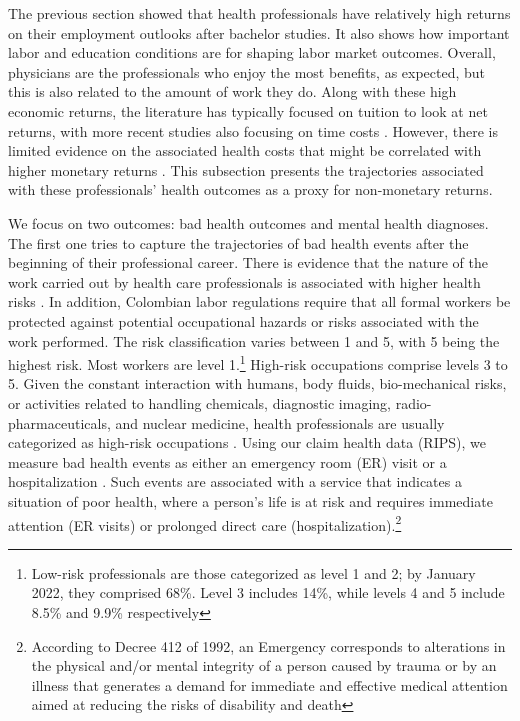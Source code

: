 \documentclass[12pt, a4paper]{article}
\begin{document}
The previous section showed that health professionals have relatively high returns on their employment outlooks after bachelor studies. It also shows how important labor and education conditions are for shaping labor market outcomes. Overall, physicians are the professionals who enjoy the most benefits, as expected, but this is also related to the amount of work they do. Along with these high economic returns, the literature has typically focused on tuition \citep{altonji2018costs} to look at net returns, with more recent studies also focusing on time costs \citep{altonji2023effects}. However, there is limited evidence on the associated health costs that might be correlated with higher monetary returns \citep{heckman2018returns}. This subsection presents the trajectories associated with these professionals' health outcomes as a proxy for non-monetary returns. 

We focus on two outcomes: bad health outcomes and mental health diagnoses. The first one tries to capture the trajectories of bad health events after the beginning of their professional career. There is evidence that the nature of the work carried out by health care professionals is associated with higher health risks \citep{mohanty2019health,kobo2023causes}. In addition, Colombian labor regulations require that all formal workers be protected against potential occupational hazards or risks associated with the work performed. The risk classification varies between 1 and 5, with 5 being the highest risk. Most workers are level 1.\footnote{Low-risk professionals are those categorized as level 1 and 2; by January 2022, they comprised 68\%. Level 3 includes 14\%, while levels 4 and 5 include 8.5\% and 9.9\% respectively} High-risk occupations comprise levels 3 to 5. Given the constant interaction with humans, body fluids, bio-mechanical risks, or activities related to handling chemicals, diagnostic imaging, radio-pharmaceuticals, and nuclear medicine, health professionals are usually categorized as high-risk occupations \citep{Ministeriodetrabajoyseguridadsocial}. Using our claim health data (RIPS), we measure bad health events as either an emergency room (ER) visit or a hospitalization \citep{hansagi2001frequent}. Such events are associated with a service that indicates a situation of poor health, where a person's life is at risk and requires immediate attention (ER visits) or prolonged direct care (hospitalization).\footnote{According to Decree 412 of 1992, an Emergency corresponds to alterations in the physical and/or mental integrity of a person caused by trauma or by an illness that generates a demand for immediate and effective medical attention aimed at reducing the risks of disability and death}
\end{document}
